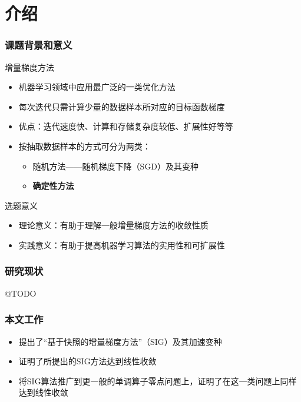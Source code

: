 \section{介绍}
\miniframesoff

\frame
{
\frametitle{课题背景和意义}
\begin{block}{增量梯度方法}
  \begin{itemize}
    \item 机器学习领域中应用最广泛的一类优化方法
    \item 每次迭代只需计算少量的数据样本所对应的目标函数梯度
    \item 优点：迭代速度快、计算和存储复杂度较低、扩展性好等等
    \item 按抽取数据样本的方式可分为两类：
      \begin{itemize}
        \item 随机方法——随机梯度下降（SGD）及其变种
        \item \textbf{确定性方法}
      \end{itemize}
  \end{itemize}
\end{block}

\pause

\begin{block}{选题意义}
  \begin{itemize}
    \item 理论意义：有助于理解一般增量梯度方法的收敛性质
    \item 实践意义：有助于提高机器学习算法的实用性和可扩展性
  \end{itemize}
\end{block}
}

\frame
{
\frametitle{研究现状}
@TODO
}

\frame
{
\frametitle{本文工作}
\begin{itemize}
  \item 提出了“基于快照的增量梯度方法”（SIG）及其加速变种 \vspace*{1em}
  \item 证明了所提出的SIG方法达到线性收敛 \vspace*{1em}
  \item 将SIG算法推广到更一般的单调算子零点问题上，证明了在这一类问题上同样达到线性收敛
\end{itemize}
}

\miniframeson
